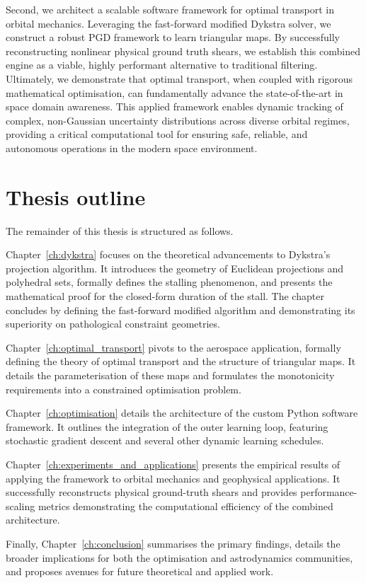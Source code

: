 Second, we architect a scalable software framework for optimal transport in orbital mechanics. Leveraging the fast-forward modified Dykstra solver, we construct a robust PGD framework to learn triangular maps. By successfully reconstructing nonlinear physical ground truth shears, we establish this combined engine as a viable, highly performant alternative to traditional filtering. Ultimately, we demonstrate that optimal transport, when coupled with rigorous mathematical optimisation, can fundamentally advance the state-of-the-art in space domain awareness. This applied framework enables dynamic tracking of complex, non-Gaussian uncertainty distributions across diverse orbital regimes, providing a critical computational tool for ensuring safe, reliable, and autonomous operations in the modern space environment.

\section{Thesis outline}

The remainder of this thesis is structured as follows. 

Chapter~\ref{ch:dykstra} focuses on the theoretical advancements to Dykstra's projection algorithm. It introduces the geometry of Euclidean projections and polyhedral sets, formally defines the stalling phenomenon, and presents the mathematical proof for the closed-form duration of the stall. The chapter concludes by defining the fast-forward modified algorithm and demonstrating its superiority on pathological constraint geometries.

Chapter~\ref{ch:optimal_transport} pivots to the aerospace application, formally defining the theory of optimal transport and the structure of triangular maps. It details the parameterisation of these maps and formulates the monotonicity requirements into a constrained optimisation problem.

Chapter~\ref{ch:optimisation} details the architecture of the custom Python software framework. It outlines the integration of the outer learning loop, featuring stochastic gradient descent and several other dynamic learning schedules.

Chapter~\ref{ch:experiments_and_applications} presents the empirical results of applying the framework to orbital mechanics and geophysical applications. It successfully reconstructs physical ground-truth shears and provides performance-scaling metrics demonstrating the computational efficiency of the combined architecture. 

Finally, Chapter~\ref{ch:conclusion} summarises the primary findings, details the broader implications for both the optimisation and astrodynamics communities, and proposes avenues for future theoretical and applied work.